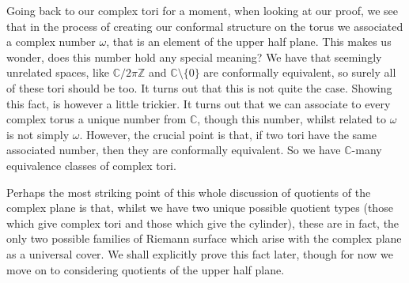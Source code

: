 \documentclass[11pt]{report}
\theoremstyle{definition}
\begin{document}
Going back to our complex tori for a moment, when looking at our proof, we see that in the process of creating our conformal structure on the torus we associated a complex number $\omega$, that is an element of the upper half plane. This makes us wonder, does this number hold any special meaning? We have that seemingly unrelated spaces, like $\mathbb{C}/2\pi \mathbb{Z}$ and $\mathbb{C}\setminus \{0\}$ are conformally equivalent, so surely all of these tori should be too. It turns out that this is not quite the case. Showing this fact, is however a little trickier. It turns out that we can associate to every complex torus a unique number from $\mathbb{C}$, though this number, whilst related to $\omega$ is not simply $\omega$. However, the crucial point is that, if two tori have the same associated number, then they are conformally equivalent. So we have $\mathbb{C}$-many equivalence classes of complex tori.

Perhaps the most striking point of this whole discussion of quotients of the complex plane is that, whilst we have two unique possible quotient types (those which give complex tori and those which give the cylinder), these are in fact, the only two possible families of Riemann surface which arise with the complex plane as a universal cover. We shall explicitly prove this fact later, though for now we move on to considering quotients of the upper half plane. 
\end{document}
